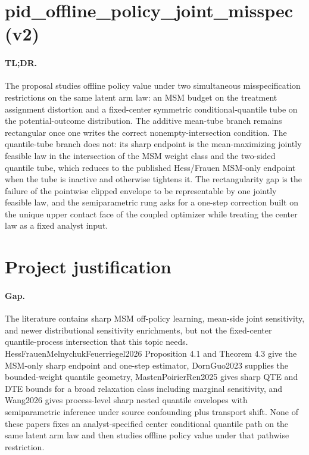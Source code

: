 \documentclass{article}
\begin{document}
\section*{pid_offline_policy_joint_misspec (v2)}

\paragraph{TL;DR.} The proposal studies offline policy value under two simultaneous misspecification restrictions on the same latent arm law: an MSM budget on the treatment assignment distortion and a fixed-center symmetric conditional-quantile tube on the potential-outcome distribution. The additive mean-tube branch remains rectangular once one writes the correct nonempty-intersection condition. The quantile-tube branch does not: its sharp endpoint is the mean-maximizing jointly feasible law in the intersection of the MSM weight class and the two-sided quantile tube, which reduces to the published Hess/Frauen MSM-only endpoint when the tube is inactive and otherwise tightens it. The rectangularity gap is the failure of the pointwise clipped envelope to be representable by one jointly feasible law, and the semiparametric rung asks for a one-step correction built on the unique upper contact face of the coupled optimizer while treating the center law as a fixed analyst input.

\section{Project justification}

\paragraph{Gap.} The literature contains sharp MSM off-policy learning, mean-side joint sensitivity, and newer distributional sensitivity enrichments, but not the fixed-center quantile-process intersection that this topic needs. HessFrauenMelnychukFeuerriegel2026 Proposition 4.1 and Theorem 4.3 give the MSM-only sharp endpoint and one-step estimator, DornGuo2023 supplies the bounded-weight quantile geometry, MastenPoirierRen2025 gives sharp QTE and DTE bounds for a broad relaxation class including marginal sensitivity, and Wang2026 gives process-level sharp nested quantile envelopes with semiparametric inference under source confounding plus transport shift. None of these papers fixes an analyst-specified center conditional quantile path on the same latent arm law and then studies offline policy value under that pathwise restriction.
\end{document}
